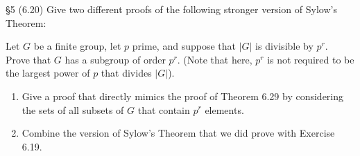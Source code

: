 \documentclass{homework}
\begin{document}
\begin{problem}{\S 5}
  (6.20) Give two different proofs of the following stronger version of Sylow's Theorem: \begin{center}
    Let $G$ be a finite group, let $p$ prime, and suppose that $\left| G \right| $ is divisible by
    $p^r$. Prove that $G$ has a subgroup of order $p^r$. (Note that here, $p^r$ is not required to
    be the largest power of $p$ that divides $\left| G \right| $).
  \end{center}
  \begin{enumerate}[label=(\alph*)]
    \item Give a proof that directly mimics the proof of Theorem 6.29 by considering the sets of all
      subsets of $G$ that contain $p^r$ elements. 
    \item Combine the version of Sylow's Theorem that we did prove with Exercise 6.19.
  \end{enumerate}
\end{problem}
\end{document}
